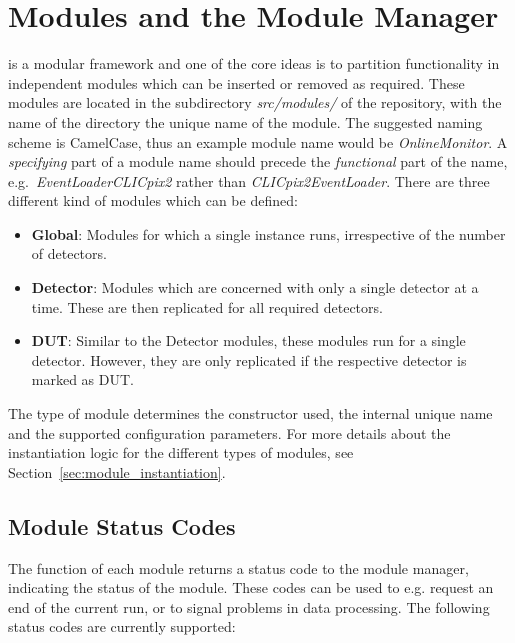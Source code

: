 \section{Modules and the Module Manager}
\label{sec:module_manager}
\corry is a modular framework and one of the core ideas is to partition functionality in independent modules which can be inserted or removed as required.
These modules are located in the subdirectory \textit{src/modules/} of the repository, with the name of the directory the unique name of the module.
The suggested naming scheme is CamelCase, thus an example module name would be \textit{OnlineMonitor}.
A \emph{specifying} part of a module name should precede the \emph{functional} part of the name, e.g.\ \textit{EventLoaderCLICpix2} rather than \textit{CLICpix2EventLoader}.
There are three different kind of modules which can be defined:
\begin{itemize}
    \item \textbf{Global}: Modules for which a single instance runs, irrespective of the number of detectors.
    \item \textbf{Detector}: Modules which are concerned with only a single detector at a time.
    These are then replicated for all required detectors.
    \item \textbf{DUT}: Similar to the Detector modules, these modules run for a single detector.
    However, they are only replicated if the respective detector is marked as DUT.
\end{itemize}
The type of module determines the constructor used, the internal unique name and the supported configuration parameters.
For more details about the instantiation logic for the different types of modules, see Section~\ref{sec:module_instantiation}.

\subsection{Module Status Codes}

The  function of each module returns a status code to the module manager, indicating the status of the module.
These codes can be used to e.g. request an end of the current run, or to signal problems in data processing.
The following status codes are currently supported:

